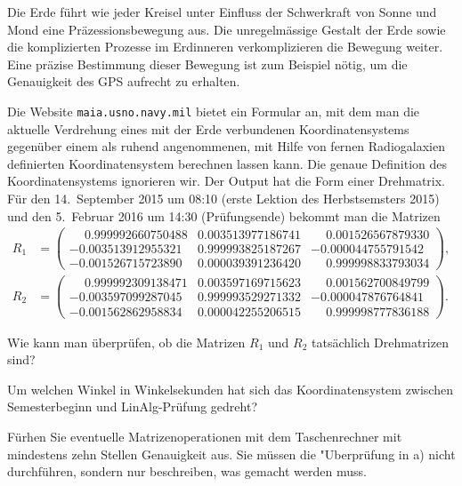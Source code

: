 Die Erde führt wie jeder Kreisel unter Einfluss der Schwerkraft von
Sonne und Mond eine Präzessionsbewegung aus.
Die unregelmässige Gestalt der Erde sowie die komplizierten Prozesse
im Erdinneren verkomplizieren die Bewegung weiter.
Eine präzise Bestimmung dieser Bewegung ist zum Beispiel nötig, um
die Genauigkeit des GPS aufrecht zu erhalten.

Die Website \texttt{maia.usno.navy.mil} bietet
ein Formular an, mit dem man die aktuelle Verdrehung eines
mit der Erde verbundenen Koordinatensystems gegenüber einem als
ruhend angenommenen, mit Hilfe von fernen Radiogalaxien definierten
Koordinatensystem berechnen lassen kann.
Die genaue Definition des Koordinatensystems ignorieren wir.
Der Output hat die Form einer Drehmatrix.
Für den 14.~September 2015 um 08:10 (erste Lektion des Herbstsemsters 2015)
und den 5.~Februar 2016 um 14:30 (Prüfungsende) bekommt man die Matrizen
\begin{align*}
R_1 &= \begin{pmatrix}
\phantom{-}0.999992660750488&0.003513977186741&\phantom{-}0.001526567879330\\
          -0.003513912955321&0.999993825187267&          -0.000044755791542\\
          -0.001526715723890&0.000039391236420&\phantom{-}0.999998833793034
\end{pmatrix},
\tag{2015-09-14 08:10}
\\
R_2 &= \begin{pmatrix}
\phantom{-}0.999992309138471&0.003597169715623&\phantom{-}0.001562700849799\\
          -0.003597099287045&0.999993529271332&          -0.000047876764841\\
          -0.001562862958834&0.000042255206515&\phantom{-}0.999998777836188
\end{pmatrix}.
\tag{2016-02-05 14:30}
\end{align*}
\begin{teilaufgaben}
\item
Wie kann man überprüfen, ob die Matrizen $R_1$ und $R_2$ tatsächlich
Drehmatrizen sind?
\item
Um welchen Winkel in Winkelsekunden hat sich das Koordinatensystem
zwischen Semesterbeginn und LinAlg-Prüfung gedreht?
\end{teilaufgaben}

\begin{hinweis}
Fürhen Sie eventuelle Matrizenoperationen mit dem Taschenrechner
mit mindestens zehn Stellen Genauigkeit aus.
Sie müssen die "Uberprüfung in a) nicht durchführen, sondern nur
beschreiben, was gemacht werden muss.
\end{hinweis}

